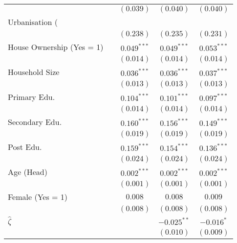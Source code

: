 \begin{table}[htbp]
\begin{center}
\begin{tabular}{l c c c c}
                          &               & $(0.039)$      & $(0.040)$      & $(0.040)$      \\
Urbanisation (\\%
                          &               & $(0.238)$      & $(0.235)$      & $(0.231)$      \\
House Ownership (Yes = 1) &               & $0.049^{***}$  & $0.049^{***}$  & $0.053^{***}$  \\
                          &               & $(0.014)$      & $(0.014)$      & $(0.014)$      \\
Household Size            &               & $0.036^{***}$  & $0.036^{***}$  & $0.037^{***}$  \\
                          &               & $(0.013)$      & $(0.013)$      & $(0.013)$      \\
Primary Edu.              &               & $0.104^{***}$  & $0.101^{***}$  & $0.097^{***}$  \\
                          &               & $(0.014)$      & $(0.014)$      & $(0.014)$      \\
Secondary Edu.            &               & $0.160^{***}$  & $0.156^{***}$  & $0.149^{***}$  \\
                          &               & $(0.019)$      & $(0.019)$      & $(0.019)$      \\
Post Edu.                 &               & $0.159^{***}$  & $0.154^{***}$  & $0.136^{***}$  \\
                          &               & $(0.024)$      & $(0.024)$      & $(0.024)$      \\
Age (Head)                &               & $0.002^{***}$  & $0.002^{***}$  & $0.002^{***}$  \\
                          &               & $(0.001)$      & $(0.001)$      & $(0.001)$      \\
Female (Yes = 1)          &               & $0.008$        & $0.008$        & $0.009$        \\
                          &               & $(0.008)$      & $(0.008)$      & $(0.008)$      \\
$\hat{\zeta}$             &               &                & $-0.025^{**}$  & $-0.016^{*}$   \\
                          &               &                & $(0.010)$      & $(0.009)$      \\

\end{tabular}
\end{center}
\end{table}
